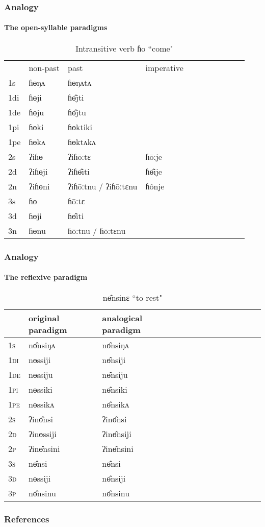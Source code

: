 \documentclass[xcolor=table]{beamer}
\newcommand{\ipa}[1]{{\phon \mbox{#1}}} %
\newcommand{\grise}[1]{\cellcolor{lightgray}\textbf{#1}}
\begin{document}
  \begin{frame} 
 \frametitle{Analogy} 
 \framesubtitle{The open-syllable paradigms}  
  
 \begin{table}[H]
\label{o.vi}
\caption{Intransitive verb \ipa{ɦo} ``come" }
\begin{tabular}{l|l|l|l|l|l|l|l|l|l|l}  \hline
&non-past & past & imperative \\ 
1s &ɦɵŋʌ &ɦɵŋʌtʌ \\ 
1di &ɦɵji &ɦɵ̂jti   \\
1de &ɦɵju &ɦɵ̂jtu   \\ 
1pi &ɦɵki &ɦɵktiki   \\ 
1pe &ɦɵkʌ &ɦɵktʌkʌ   \\ 
2s & ʔiɦɵ & ʔiɦōːtɛ &ɦōːje  \\ 
2d & ʔiɦɵji & ʔiɦɵ̂iti &ɦɵ̂ije    \\
2n & ʔiɦɵni  & ʔiɦōːtnu / ʔiɦōːtɛnu \grise{}&ɦônje  \\ 
3s & ɦɵ & ɦōːtɛ   \\ 
3d & ɦɵji & ɦɵ̂iti     \\ 
3n & ɦɵnu  & ɦōːtnu / ɦōːtɛnu \grise{} \\ 
\hline
\end{tabular}
\end{table}
  \end{frame} 
  
  \begin{frame} 
 \frametitle{Analogy} 
 \framesubtitle{The reflexive paradigm}
 
\begin{table}[H]
 \centering 
\caption{ \ipa{nɵ̂nsinɛ}  ``to rest"  } \label{tab:no}
\begin{tabular}{l|l|l|l|l|l|l|l|l|l|l|l|l} 
 \hline
&original paradigm& analogical paradigm \\
\hline
\textsc{1s} & \ipa{nɵ̂nsiŋʌ} &\ipa{nɵ̂nsiŋʌ} \\ 
\textsc{1di} & \ipa{nɵssiji} &\ipa{nɵ̂nsiji} \grise{}  \\
\textsc{1de} & \ipa{nɵssiju} & \ipa{nɵ̂nsiju} \grise{}  \\ 
\textsc{1pi} & \ipa{nɵssiki} & \ipa{nɵ̂nsiki}  \grise{} \\ 
\textsc{1pe} & \ipa{nɵssikʌ} & \ipa{nɵ̂nsikʌ} \grise{}  \\ 
\textsc{2s} & \ipa{ʔinɵ̂nsi} & \ipa{ʔinɵ̂nsi}   \\ 
\textsc{2d} & \ipa{ʔinɵssiji} & \ipa{ʔinɵ̂nsiji}  \grise{}  \\
\textsc{2p} & \ipa{ʔinɵ̂nsini}  & \ipa{ʔinɵ̂nsini}    \\ 
\textsc{3s} & \ipa{nɵ̂nsi} & \ipa{nɵ̂nsi}   \\ 
\textsc{3d} & \ipa{nɵssiji} & \ipa{nɵ̂nsiji}  \grise{} \\ 
\textsc{3p} & \ipa{nɵ̂nsinu}  & \ipa{nɵ̂nsinu} \\ 
\hline
\end{tabular}
\end{table}
 
  \end{frame}     
  
 \begin{frame} 
 \frametitle{References}
 
 

 \end{frame}
\end{document}

